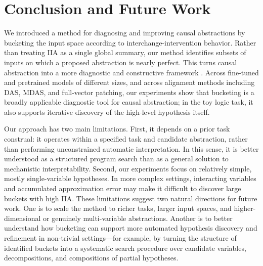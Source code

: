 \section{Conclusion and Future Work}

We introduced a method for diagnosing and improving causal abstractions by bucketing the input space according to interchange-intervention behavior. Rather than treating IIA as a single global summary, our method identifies subsets of inputs on which a proposed abstraction is nearly perfect. This turns causal abstraction into a more diagnostic and constructive framework
. Across fine-tuned and pretrained models of different sizes, and across alignment methods including DAS, MDAS, and full-vector patching, our experiments show that bucketing is a broadly applicable diagnostic tool for causal abstraction; in the toy logic task, it also supports iterative discovery of the high-level hypothesis itself.

Our approach has two main limitations. First, it depends on a prior task construal: it operates within a specified task and candidate abstraction, rather than performing unconstrained automatic interpretation. In this sense, it is better understood as a structured program search than as a general solution to mechanistic interpretability. Second, our experiments focus on relatively simple, mostly single-variable hypotheses. In more complex settings, interacting variables and accumulated approximation error may make it difficult to discover large buckets with high IIA. 
These limitations suggest two natural directions for future work. One is to scale the method to richer tasks, larger input spaces, and higher-dimensional or genuinely multi-variable abstractions. Another is to better understand how bucketing can support more automated hypothesis discovery and refinement in non-trivial settings---for example, by turning the structure of identified buckets into a systematic search procedure over candidate variables, decompositions, and compositions of partial hypotheses.


